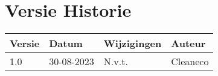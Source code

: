 \section*{Versie Historie} 

\begin{table}[h]
\begin{tabular}{|l|l|l|l|}
\hline
\rowcolor[HTML]{4472C4} 
{\color[HTML]{FFFFFF} \textbf{Versie}} &
  {\color[HTML]{FFFFFF} \textbf{Datum}} &
  {\color[HTML]{FFFFFF} \textbf{Wijzigingen}} &
  {\color[HTML]{FFFFFF} \textbf{Auteur}} \\ \hline
\rowcolor[HTML]{D9E1F2} 
1.0 &
  \multicolumn{1}{c|}{\cellcolor[HTML]{D9E1F2}30-08-2023} &
 N.v.t. &
  Cleaneco \\ \hline



\end{tabular}
\end{table}
{}
\listoffigures
{}
{}
\listofmyequations